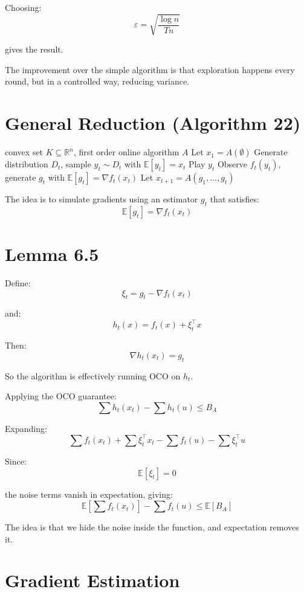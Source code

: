 \documentclass{article}
\begin{document}
Choosing:
\[
\varepsilon = \sqrt{\frac{\log n}{T n}}
\]

gives the result.

The improvement over the simple algorithm is that exploration happens every round, but in a controlled way, reducing variance.

\section{General Reduction (Algorithm 22)}

\begin{algorithm}
\caption{Reduction to bandit feedback}
\begin{algorithmic}[1]
\REQUIRE convex set $K \subseteq \mathbb{R}^n$, first order online algorithm $A$
\STATE Let $x_1 = A(\emptyset)$
    \STATE Generate distribution $D_t$, sample $y_t \sim D_t$ with $\mathbb{E}[y_t] = x_t$
    \STATE Play $y_t$
    \STATE Observe $f_t(y_t)$, generate $g_t$ with $\mathbb{E}[g_t] = \nabla f_t(x_t)$
    \STATE Let $x_{t+1} = A(g_1,\dots,g_t)$
\ENDFOR
\end{algorithmic}
\end{algorithm}

The idea is to simulate gradients using an estimator $g_t$ that satisfies:
\[
\mathbb{E}[g_t] = \nabla f_t(x_t)
\]

\section{Lemma 6.5}

Define:
\[
\xi_t = g_t - \nabla f_t(x_t)
\]

and:
\[
h_t(x) = f_t(x) + \xi_t^\top x
\]

Then:
\[
\nabla h_t(x_t) = g_t
\]

So the algorithm is effectively running OCO on $h_t$.

Applying the OCO guarantee:
\[
\sum h_t(x_t) - \sum h_t(u) \le B_A
\]

Expanding:
\[
\sum f_t(x_t) + \sum \xi_t^\top x_t - \sum f_t(u) - \sum \xi_t^\top u
\]

Since:
\[
\mathbb{E}[\xi_t] = 0
\]

the noise terms vanish in expectation, giving:
\[
\mathbb{E}\left[\sum f_t(x_t)\right] - \sum f_t(u) \le \mathbb{E}[B_A]
\]

The idea is that we hide the noise inside the function, and expectation removes it.

\section{Gradient Estimation}
\end{document}
